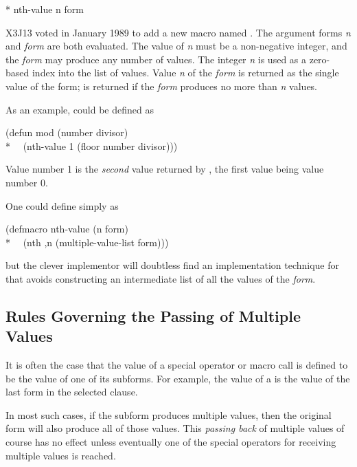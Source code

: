 \begin{new}
\begin{defmac}*
nth-value n form

X3J13 voted in January 1989
to add a new macro named .
The argument forms \emph{n} and \emph{form} are both evaluated.
The value of \emph{n} must be a non-negative integer,
and the \emph{form} may produce any number of values.
The integer \emph{n} is used as a zero-based index into the
list of values.
Value \emph{n} of the \emph{form} is returned as the
single value of the  form;  is returned if the
\emph{form} produces no more than \emph{n} values.

As an example,  could be defined as
\begin{lisp}
(defun mod (number divisor) \\*
~~(nth-value 1 (floor number divisor)))
\end{lisp}
Value number 1 is the \emph{second} value returned by ,
the first value being value number 0.

One could define  simply as
\begin{lisp}
(defmacro nth-value (n form) \\*
~~{\Xbq}(nth ,n (multiple-value-list form)))
\end{lisp}
but the clever implementor will doubtless find an implementation
technique for  that avoids constructing an intermediate
list of all the values of the \emph{form}.
\end{defmac}
\end{new}

\subsection{Rules Governing the Passing of Multiple Values}

It is often the case that the value
of a special operator or macro call
is defined to be the value of one of its subforms.
For example, the
value of a  is the value of the last form in the selected clause.

In most such cases, if the subform produces multiple values, then the original
form will also produce all of those values.
This \emph{passing back} of
multiple values of course has no effect unless eventually one of the
special operators for receiving multiple values is reached.

